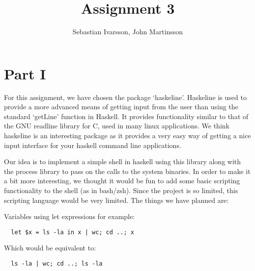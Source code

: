 \documentclass[11pt,a4paper]{article}
\begin{document}
\pagestyle{fancy}

\renewcommand{\headrulewidth}{0pt} \setlength{\headsep}{30pt}
\setlength{\headheight}{30pt}

\title{Assignment 3}
\author{Sebastian Ivarsson, John Martinsson}
\maketitle
\thispagestyle{fancy}


\section{Part I}
For this assignment, we have chosen the package ‘haskeline’. Haskeline is used
to provide a more advanced means of getting input from the user than using the
standard ‘getLine’ function in Haskell. It provides functionality similar to
that of the GNU readline library for C, used in many linux applications. We
think haskeline is an interesting package as it provides a very easy way of
getting a nice input interface for your haskell command line applications.

Our idea is to implement a simple shell in haskell using this library along with
the process library to pass on the calls to the system binaries. In order to
make it a bit more interesting, we thought it would be fun to add some basic
scripting functionality to the shell (as in bash/zsh). Since the project is so
limited, this scripting language would be very limited. The things we have
planned are:

Variables using let expressions for example:
\begin{verbatim}
  let $x = ls -la in x | wc; cd ..; x
\end{verbatim}

Which would be equivalent to:

\begin{verbatim}
  ls -la | wc; cd ..; ls -la
\end{verbatim}
\end{document}
